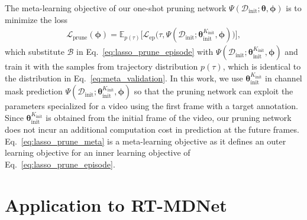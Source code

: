 \documentclass[letterpaper]{article} %
\def \datainit{\mathcal{D}_\text{init}}
\def \phigeneral{\boldsymbol{\phi}}
\def \thetageneral{\boldsymbol{\theta}}
\def \thetainitadapt{\boldsymbol{\theta}_\text{init}}
\def \Kinit{K_\text{init}}
\def \lossepisode{\mathcal{L}_\text{ep}}
\def \lossprune{\mathcal{L}_\text{prune}}
\begin{document}
The meta-learning objective of our one-shot pruning network $\Psi(\datainit;\thetageneral, \phigeneral)$ is to minimize the loss
\begin{align}
\lossprune(\phigeneral) = \mathbb{E}_{p(\tau)} \Big[
	\lossepisode\big(\tau, \Psi(\datainit; \thetainitadapt^{\Kinit}, \phigeneral)\big)
\Big],
\label{eq:lasso_prune_meta}
\end{align}
which substitute $\mathcal{B}$ in Eq.~\eqref{eq:lasso_prune_episode} with $\Psi(\datainit; \thetainitadapt^{\Kinit}, \phigeneral)$ and train it with the samples from trajectory distribution $p(\tau)$, which is identical to the distribution in Eq.~\eqref{eq:meta_validation}. 
In this work, we use $\thetainitadapt^{\Kinit}$ in channel mask prediction $\Psi(\datainit; \thetainitadapt^{\Kinit}, \phigeneral)$ so that the pruning network can exploit the parameters specialized for a video using the first frame with a target annotation.
Since $\thetainitadapt^{\Kinit}$ is obtained from the initial frame of the video, our pruning network does not incur an additional computation cost in prediction at the future frames. Eq.~\eqref{eq:lasso_prune_meta} is a meta-learning objective as it defines an outer learning objective for an inner learning objective of Eq.~\eqref{eq:lasso_prune_episode}.  


\iffalse
\section{Application to RT-MDNet}
\end{document}
